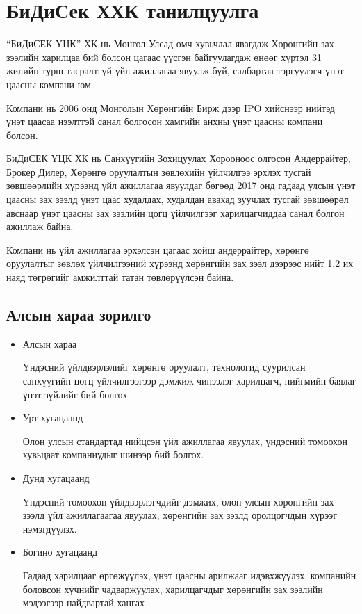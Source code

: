 \section{БиДиСек ХХК танилцуулга}
“БиДиСЕК ҮЦК” ХК нь Монгол Улсад өмч хувьчлал явагдаж Хөрөнгийн зах зээлийн харилцаа бий болсон цагаас үүсгэн байгуулагдаж өнөөг хүртэл 31 жилийн турш тасралтгүй үйл ажиллагаа явуулж буй, салбартаа тэргүүлэгч үнэт цаасны компани юм. \par
Компани нь 2006 онд Монголын Хөрөнгийн Бирж дээр IPO хийснээр нийтэд үнэт цаасаа нээлттэй санал болгосон хамгийн анхны үнэт цаасны компани болсон. \par
БиДиСЕК ҮЦК ХК нь Санхүүгийн Зохицуулах Хорооноос олгосон Андеррайтер, Брокер Дилер, Хөрөнгө оруулалтын зөвлөхийн үйлчилгээ эрхлэх тусгай зөвшөөрлийн хүрээнд үйл ажиллагаа явуулдаг бөгөөд 2017 онд гадаад улсын үнэт цаасны зах зээлд үнэт цаас худалдах, худалдан авахад зуучлах тусгай зөвшөөрөл авснаар үнэт цаасны зах зээлийн цогц үйлчилгээг харилцагчиддаа санал болгон ажиллаж байна. \par
Компани нь үйл ажиллагаа эрхэлсэн цагаас хойш андеррайтер, хөрөнгө оруулалтыг зөвлөх үйлчилгээний хүрээнд хөрөнгийн зах зээл дээрээс нийт 1.2 их наяд төгрөгийг амжилттай татан төвлөрүүлсэн байна.
\subsection{Алсын хараа зорилго}
    \begin{itemize}
        \item Алсын хараа \par
        Үндэсний үйлдвэрлэлийг хөрөнгө оруулалт, технологид суурилсан санхүүгийн цогц үйлчилгээгээр дэмжиж чинээлэг харилцагч, нийгмийн баялаг үнэт зүйлийг бий болгох

        \item Урт хугацаанд \par
        Олон улсын стандартад нийцсэн үйл ажиллагаа явуулах, үндэсний томоохон хувьцаат компаниудыг шинээр бий болгох.

        \item Дунд хугацаанд \par
        Үндэсний томоохон үйлдвэрлэгчдийг дэмжих, олон улсын хөрөнгийн зах зээлд үйл ажиллагаагаа явуулах, хөрөнгийн зах зээлд оролцогчдын хүрээг нэмэгдүүлэх.

        \item Богино хугацаанд \par
        Гадаад харилцааг өргөжүүлэх, үнэт цаасны арилжааг идэвхжүүлэх, компанийн боловсон хүчнийг 
        чадваржуулах, харилцагчдыг хөрөнгийн зах зээлийн 
        мэдээгээр найдвартай хангах

    \end{itemize}
